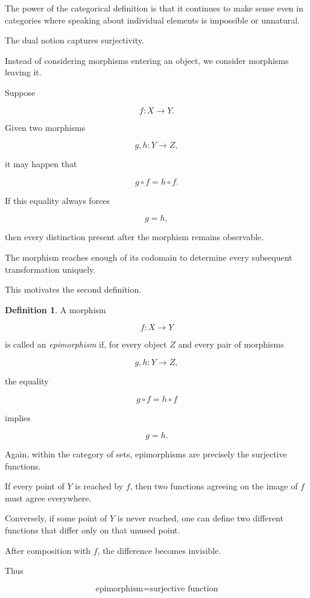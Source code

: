 \documentclass[11pt]{book}
\numberwithin{equation}{chapter}
\theoremstyle{definition}
\newtheorem{definition}{Definition}[chapter]
\theoremstyle{plain}
\theoremstyle{remark}
\begin{document}
The power of the categorical definition is that it continues to make sense even in categories where speaking about individual elements is impossible or unnatural.

The dual notion captures surjectivity.

Instead of considering morphisms entering an object, we consider morphisms leaving it.

Suppose

\[
f:X\rightarrow Y.
\]

Given two morphisms

\[
g,h:Y\rightarrow Z,
\]

it may happen that

\[
g\circ f
=
h\circ f.
\]

If this equality always forces

\[
g=h,
\]

then every distinction present after the morphism remains observable.

The morphism reaches enough of its codomain to determine every subsequent transformation uniquely.

This motivates the second definition.

\begin{definition}
A morphism

\[
f:X\rightarrow Y
\]

is called an \emph{epimorphism} if, for every object \(Z\) and every pair of morphisms

\[
g,h:Y\rightarrow Z,
\]

the equality

\[
g\circ f
=
h\circ f
\]

implies

\[
g=h.
\]
\end{definition}

Again, within the category of sets, epimorphisms are precisely the surjective functions.

If every point of \(Y\) is reached by \(f\), then two functions agreeing on the image of \(f\) must agree everywhere.

Conversely, if some point of \(Y\) is never reached, one can define two different functions that differ only on that unused point.

After composition with \(f\), the difference becomes invisible.

Thus

\[
\boxed{
\text{epimorphism}
=
\text{surjective function}
}
\]
\end{document}
